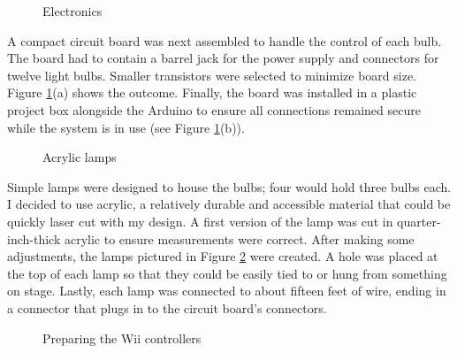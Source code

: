 \begin{figure}
	\centering

	\hspace{0.1cm}

	\caption{Electronics}

	\label{prototyping3.4}
\end{figure}

A compact circuit board was next assembled to handle the control of each bulb. The board had to contain a barrel jack for the power supply and connectors for twelve light bulbs. Smaller transistors were selected to minimize board size. Figure \ref{prototyping3.4}(a) shows the outcome. Finally, the board was installed in a plastic project box alongside the Arduino to ensure all connections remained secure while the system is in use (see Figure \ref{prototyping3.4}(b)).

\begin{figure}
	\centering

	\hspace{0.1cm}

	\caption{Acrylic lamps}

	\label{prototyping3.5}
\end{figure}

Simple lamps were designed to house the bulbs; four would hold three bulbs each. I decided to use acrylic, a relatively durable and accessible material that could be quickly laser cut with my design. A first version of the lamp was cut in quarter-inch-thick acrylic to ensure measurements were correct. After making some adjustments, the lamps pictured in Figure \ref{prototyping3.5} were created. A hole was placed at the top of each lamp so that they could be easily tied to or hung from something on stage. Lastly, each lamp was connected to about fifteen feet of wire, ending in a connector that plugs in to the circuit board's connectors.

\begin{figure}
	\centering

	\hspace{0.1cm}

	\caption{Preparing the Wii controllers}

	\label{prototyping3.6}
\end{figure}

